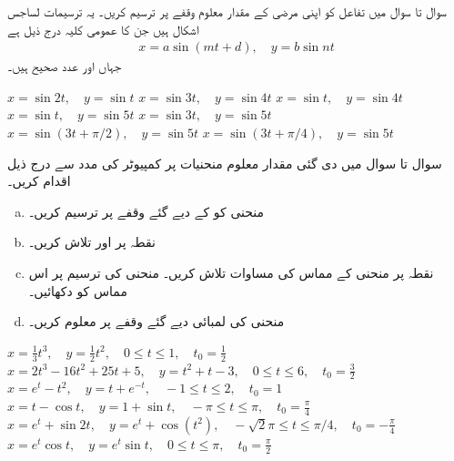 سوال  تا سوال  میں تفاعل کو اپنی مرضی کے مقدار معلوم وقفے   پر ترسیم کریں۔ یہ ترسیمات لساجس اشکال ہیں جن کا عمومی کلیہ درج ذیل ہے
\begin{align*}
x=a\sin(mt+d),\quad y=b\sin nt
\end{align*}
جہاں  اور  عدد صحیح ہیں۔

$x=\sin 2t,\quad y=\sin t$
$x=\sin 3t,\quad y=\sin 4t$
$x=\sin t,\quad y=\sin 4t$
$x=\sin t,\quad y=\sin 5t$
$x=\sin 3t,\quad y=\sin 5t$
$x=\sin (3t+\pi/2),\quad y=\sin 5t$
$x=\sin (3t+\pi/4),\quad y=\sin 5t$

سوال  تا سوال  میں دی گئی  مقدار معلوم منحنیات پر کمپیوٹر کی مدد سے درج ذیل اقدام کریں۔
\begin{enumerate}[a.]
\item
منحنی کو   کے دیے گئے وقفے  پر ترسیم کریں۔ 
\item
نقطہ  پر  اور  تلاش کریں۔
\item
نقطہ  پر منحنی کے مماس کی مساوات تلاش کریں۔ منحنی کی ترسیم پر اس مماس کو دکھائیں۔ 
\item
منحنی کی لمبائی دیے گئے وقفے  پر معلوم کریں۔
\end{enumerate}

 $x=\frac{1}{3}t^3,\quad y=\frac{1}{2}t^2,\quad 0\le t\le 1,\quad t_0=\frac{1}{2}$
 $x=2t^3-16t^2+25t+5,\quad y=t^2+t-3,\quad 0\le t\le 6,\quad t_0=\frac{3}{2}$
 $x=e^t-t^2,\quad y=t+e^{-t},\quad -1\le t\le 2,\quad t_0=1$
 $x=t-\cos t,\quad y=1+\sin t,\quad -\pi\le t\le \pi,\quad t_0=\frac{\pi}{4}$
 $x=e^t+\sin 2t,\quad y=e^t+\cos(t^2),\quad -\sqrt{2}\pi\le t\le \pi/4,\quad t_0=-\frac{\pi}{4}$
 $x=e^t\cos t,\quad y=e^t\sin t,\quad 0\le t\le \pi,\quad t_0=\frac{\pi}{2}$

